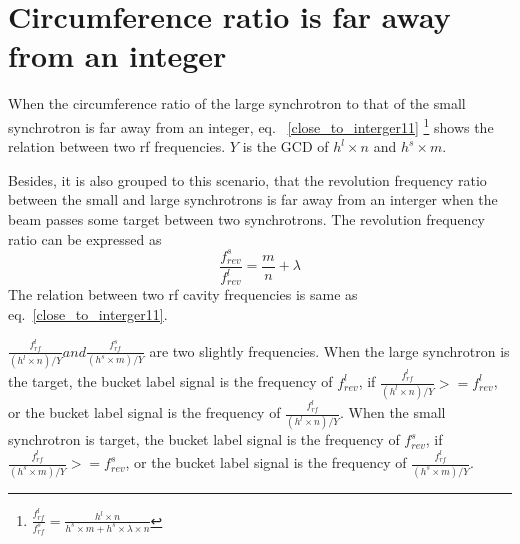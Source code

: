 \section{Circumference ratio is far away from an integer} 
When the circumference ratio of the large synchrotron to that of the small synchrotron is far away from an integer, eq. ~\ref{close_to_interger11} \footnote{$\frac{f_{\mathit{rf}}^{l}}{f_{\mathit{rf}}^{s}}=\frac{h^l\times n}{h^s \times m+ h^s \times\lambda\times n}$} shows the relation between two rf frequencies. $Y$ is the GCD of $h^l\times n$ and $h^s \times m$.
%
%




Besides, it is also grouped to this scenario, that the revolution frequency ratio between the small and large synchrotrons is far away from an interger when the beam passes some target between two synchrotrons. The revolution frequency ratio can be expressed as
\begin{equation} 
\frac{f_{\mathit{rev}}^{s}}{f_{\mathit{rev}}^{l}}=\frac{m}{n}+ \lambda\label{close_to_interger2}
\end{equation}
The relation between two rf cavity frequencies is same as eq.~\ref{close_to_interger11}.

$\frac{f_{\mathit{rf}}^{l}}{(h^l\times n)/Y} and \frac{f_{\mathit{rf}}^{s}}{(h^s\times m)/Y}$ are two slightly frequencies. When the large synchrotron is the target, the bucket label signal is the frequency of $f_{\mathit{rev}}^{l}$, if $\frac{f_{\mathit{rf}}^{l}}{(h^l\times n)/Y}>=f_{\mathit{rev}}^{l}$, or the bucket label signal is the frequency of $\frac{f_{\mathit{rf}}^{l}}{(h^l\times n)/Y}$. When the small synchrotron is target, the bucket label signal is the frequency of $f_{\mathit{rev}}^{s}$, if $\frac{f_{\mathit{rf}}^{l}}{(h^s\times m)/Y}>=f_{\mathit{rev}}^{s}$, or the bucket label signal is the frequency of $\frac{f_{\mathit{rf}}^{l}}{(h^s\times m)/Y}$. 

